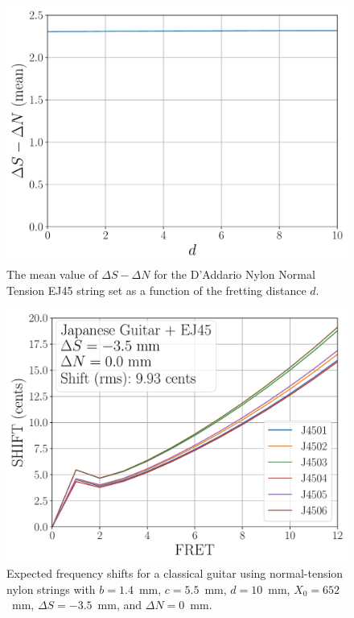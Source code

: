 \begin{figure}
  \centering
  \includegraphics[width=5.0in]{../figures/dsnd_ej45}
  \caption{\label{fig:dsnd_ej45} The mean value of $\Delta S - \Delta N$ for the D'Addario Nylon Normal Tension EJ45 string set as a function of the fretting distance $d$.}
\end{figure}

\begin{figure}
  \centering
  \includegraphics[width=5.0in]{../figures/japan_guitar_ej45_shifts}
  \caption{\label{fig:japan_guitar_ej45_shifts} Expected frequency shifts for a classical guitar using normal-tension nylon strings with $b = 1.4$~mm, $c = 5.5$~mm, $d = 10$~mm, $X_0 = 652$~mm, $\Delta S = -3.5$~mm, and $\Delta N = 0$~mm.}
\end{figure}

